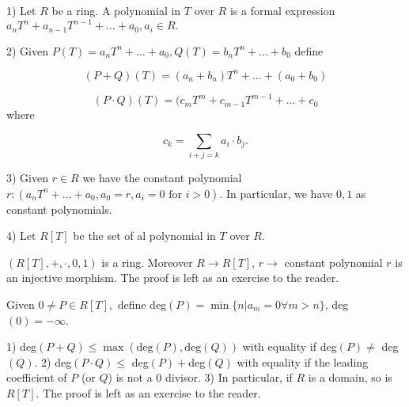 \begin{defn}

1) Let $R$ be a ring. A polynomial in $T$ over $R$ is a formal expression $a_nT^n+a_{n-1}T^{n-1}+\ldots+a_0,a_i\in R.$

2) Given $P(T)=a_nT^n+\ldots+a_0,Q(T)=b_nT^n+\ldots+b_0$ define

$$(P+Q)(T)=(a_n+b_n)T^n+\ldots+(a_0+b_0)$$

$$(P\cdot Q)(T)=(c_mT^m+c_{m-1}T^{m-1}+\ldots+c_0$$ where

$$c_k=\sum_{i+j=k}a_i\cdot b_j.$$

3) Given $r\in R$ we have the constant polynomial
$r:(a_nT^n+\ldots+a_0,a_0=r,a_i=0\text{ for } i>0).$ In particular, we have $0,1$ as constant polynomials.

4) Let $R[T]$ be the set of al polynomial in $T$ over $R$.

\begin{fact} $(R[T],+,\cdot,0,1)$ is a ring. Moreover $R\rightarrow R[T]$, $r\rightarrow$ constant polynomial $r$ is an injective morphism. The proof is left as an exercise to the reader.
\end{fact}

\end{defn}

\begin{defn}

Given $0\ne P\in R[T],$ define deg$(P)=\min\{n|a_m=0\forall m>n\}$, deg$(0)=-\infty$.
\end{defn}
\begin{fact}\label{polyringdomain}
1) deg$(P+Q)\leq\max(\text{deg}(P),\text{deg}(Q))$ with equality if deg$(P)\ne$ deg$(Q)$.
2) deg$(P\cdot Q)\leq$ deg$(P)+$deg$(Q)$ with equality if the leading coefficient of $P$ (or $Q$) is not a 0 divisor.
3) In particular, if $R$ is a domain, so is $R[T].$ The proof is left as an exercise to the reader.
\end{fact}
